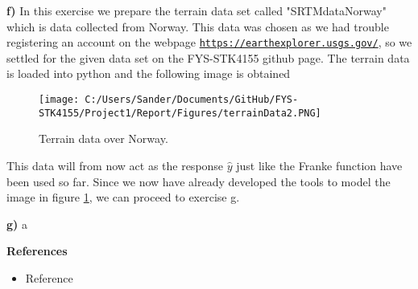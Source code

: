 \documentclass[12pt,a4paper]{article}
\begin{document}
\newpage

\noindent \textbf{f)} In this exercise we prepare the terrain data set called "SRTM\textunderscore data\textunderscore Norway" which is data collected from Norway. This data was chosen as we had trouble registering an account on the webpage \href{{https://earthexplorer.usgs.gov/}}{\nolinkurl{https://earthexplorer.usgs.gov/}}, so we settled for the given data set on the FYS-STK4155 github page. The terrain data is loaded into python and the following image is obtained

\begin{figure}[H]
\centering
\texttt{[image: C:/Users/Sander/Documents/GitHub/FYS-STK4155/Project1/Report/Figures/terrainData2.PNG]}
\caption{\label{fig:terrainData1} Terrain data over Norway.}
\end{figure}

\noindent This data will from now act as the response $\hat{y}$ just like the Franke function have been used so far. Since we now have already developed the tools to model the image in figure \ref{fig:terrainData1}, we can proceed to exercise g.

\newpage

\noindent \textbf{g)} a

\newpage

\begin{center}
\Large{\textbf{References}}
\end{center}

\begin{itemize}
  \item Reference
\end{itemize}
\end{document}

